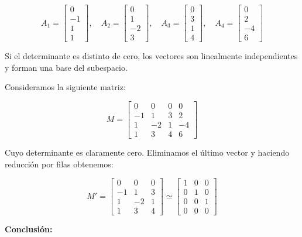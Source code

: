 \documentclass[a4paper]{article}
\begin{document}
\begin{enumerate}
\[
A_1 = \begin{bmatrix} 0 \\ -1 \\ 1 \\ 1 \end{bmatrix}, \quad
A_2 = \begin{bmatrix} 0 \\ 1 \\ -2 \\ 3 \end{bmatrix}, \quad
A_3 = \begin{bmatrix} 0 \\ 3 \\ 1 \\ 4 \end{bmatrix}, \quad
A_4 = \begin{bmatrix} 0 \\ 2 \\ -4 \\ 6 \end{bmatrix}
\]

Si el determinante es distinto de cero, los vectores son linealmente independientes y forman una base del subespacio.

Consideramos la siguiente matriz:

\[
M = \begin{bmatrix}
0 & 0 & 0 & 0 \\
-1 & 1 & 3 & 2 \\
1 & -2 & 1 & -4 \\
1 & 3 & 4 & 6
\end{bmatrix}
\]

Cuyo determinante es claramente cero. Eliminamos el \'ultimo vector y haciendo reducci\'on por filas obtenemos:

\[
M' = \begin{bmatrix}
0 & 0 & 0 \\
-1 & 1 & 3  \\
1 & -2 & 1  \\
1 & 3 & 4 
\end{bmatrix}\simeq \begin{bmatrix}
 1 & 0 & 0 \\
 0& 1 & 0 \\
 0 & 0 & 1 \\
0 & 0 & 0
\end{bmatrix}
\]


\textbf{Conclusión:}


\end{enumerate}
\end{document}
